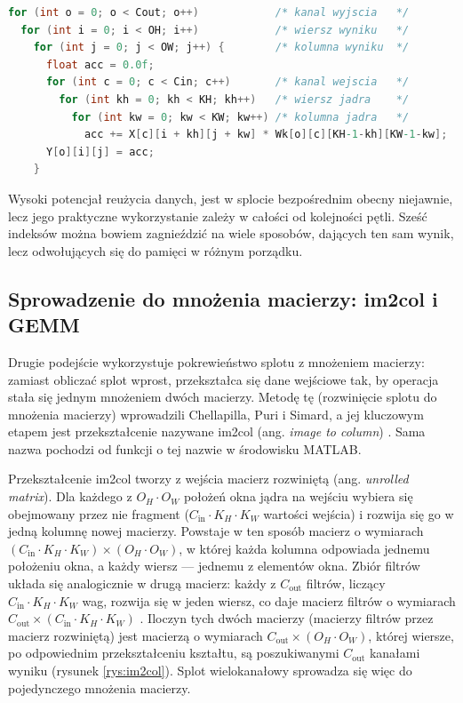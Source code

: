 \documentclass[a4paper,12pt]{book} %
\begin{document}
\begin{lstfloat}[t!]
\begin{lstlisting}[language=C, caption={Splot bezpośredni: sześć zagnieżdżonych pętli odwzorowujących wprost wzór splotu wielokanałowego (układ NCHW, splot bez wypełnienia, krok jednostkowy)}, label={lst:splot-direct}]
for (int o = 0; o < Cout; o++)            /* kanal wyjscia   */
  for (int i = 0; i < OH; i++)            /* wiersz wyniku   */
    for (int j = 0; j < OW; j++) {        /* kolumna wyniku  */
      float acc = 0.0f;
      for (int c = 0; c < Cin; c++)       /* kanal wejscia   */
        for (int kh = 0; kh < KH; kh++)   /* wiersz jadra    */
          for (int kw = 0; kw < KW; kw++) /* kolumna jadra   */
            acc += X[c][i + kh][j + kw] * Wk[o][c][KH-1-kh][KW-1-kw];
      Y[o][i][j] = acc;
    }
\end{lstlisting}
\end{lstfloat}

Wysoki potencjał reużycia danych, jest w splocie bezpośrednim obecny niejawnie, lecz jego praktyczne wykorzystanie zależy w całości od kolejności pętli. Sześć indeksów można bowiem zagnieździć na wiele sposobów, dających ten sam wynik, lecz odwołujących się do pamięci w różnym porządku.

\subsection{Sprowadzenie do mnożenia macierzy: im2col i GEMM}
\label{sec:splot-im2col}

Drugie podejście wykorzystuje pokrewieństwo splotu z mnożeniem macierzy: zamiast obliczać splot wprost, przekształca się dane wejściowe tak, by operacja stała się jednym mnożeniem dwóch macierzy. Metodę tę (rozwinięcie splotu do mnożenia macierzy) wprowadzili Chellapilla, Puri i Simard, a jej kluczowym etapem jest przekształcenie nazywane im2col (ang. \emph{image to column}) \cite{chellapilla2006highperf,vasudevan2017mcmk}. Sama nazwa pochodzi od funkcji o tej nazwie w środowisku MATLAB.

Przekształcenie im2col tworzy z wejścia macierz rozwiniętą (ang. \emph{unrolled matrix}). Dla każdego z $O_H \cdot O_W$ położeń okna jądra na wejściu wybiera się obejmowany przez nie fragment ($C_{\mathrm{in}} \cdot K_H \cdot K_W$ wartości wejścia) i rozwija się go w jedną kolumnę nowej macierzy. Powstaje w ten sposób macierz o wymiarach $(C_{\mathrm{in}} \cdot K_H \cdot K_W) \times (O_H \cdot O_W)$, w której każda kolumna odpowiada jednemu położeniu okna, a każdy wiersz --- jednemu z elementów okna. Zbiór filtrów układa się analogicznie w drugą macierz: każdy z $C_{\mathrm{out}}$ filtrów, liczący $C_{\mathrm{in}} \cdot K_H \cdot K_W$ wag, rozwija się w jeden wiersz, co daje macierz filtrów o wymiarach $C_{\mathrm{out}} \times (C_{\mathrm{in}} \cdot K_H \cdot K_W)$ \cite{chellapilla2006highperf,vasudevan2017mcmk}. Iloczyn tych dwóch macierzy (macierzy filtrów przez macierz rozwiniętą) jest macierzą o wymiarach $C_{\mathrm{out}} \times (O_H \cdot O_W)$, której wiersze, po odpowiednim przekształceniu kształtu, są poszukiwanymi $C_{\mathrm{out}}$ kanałami wyniku (rysunek \ref{rys:im2col}). Splot wielokanałowy sprowadza się więc do pojedynczego mnożenia macierzy.
\end{document}
